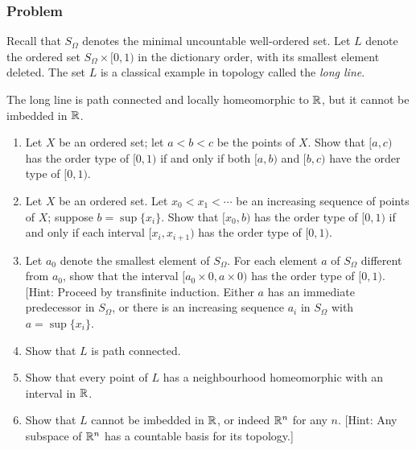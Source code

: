 \subsubsection{Problem}
Recall that $S_\Omega$ denotes the minimal uncountable well-ordered set. Let $L$ denote the ordered set $S_\Omega \times [0,1)$ in the dictionary order, with its smallest element deleted. The set $L$ is a classical example in topology called the \emph{long line}.

\begin{theorem}
The long line is path connected and locally homeomorphic to $\mathbb R$, but it cannot be imbedded in $\mathbb R$.
\end{theorem}
\begin{enumerate}
\item Let $X$ be an ordered set; let $a < b < c$ be the points of $X$. Show that $[a,c)$ has the order type of $[0,1)$ if and only if both $[a,b)$ and $[b,c)$ have the order type of $[0,1)$.
\item Let $X$ be an ordered set. Let $x_0 < x_1 < \cdots$ be an increasing sequence of points of $X$; suppose $b = \sup \{x_i\}$. Show that $[x_0, b)$ has the order type of $[0,1)$ if and only if each interval $[x_i, x_{i+1})$ has the order type of $[0,1)$.
\item Let $a_0$ denote the smallest element of $S_\Omega$. For each element $a$ of $S_\Omega$ different from $a_0$, show that the interval $[a_0 \times 0, a \times 0)$ has the order type of $[0,1)$. [Hint: Proceed by transfinite induction. Either $a$ has an immediate predecessor in $S_\Omega$, or there  is an increasing sequence $a_i$ in $S_\Omega$ with $a = \sup \{x_i\}$.
\item Show that $L$ is path connected.
\item Show that every point of $L$ has a neighbourhood homeomorphic with an interval in $\mathbb R$.
\item Show that $L$ cannot be imbedded in $\mathbb R$, or indeed $\mathbb R^n$ for any $n$. [Hint: Any subspace of $\mathbb R^n$ has a countable basis for its topology.]
\end{enumerate}
